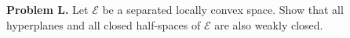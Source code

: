 \textbf{Problem L.} Let $\mathcal{E}$ be a separated locally convex space. Show that all hyperplanes and all closed half-spaces of $\mathcal{E}$ are also weakly closed.
